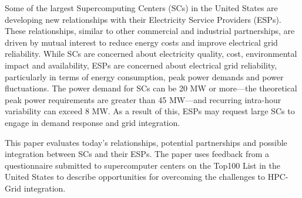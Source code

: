 Some of the largest Supercomputing Centers (SCs) in the United States are developing new relationships with their Electricity Service Providers (ESPs). These relationships, similar to other commercial and industrial partnerships, are driven by mutual interest to reduce energy costs and improve electrical grid reliability. While SCs are concerned about electricity quality, cost, environmental impact and availability, ESPs are concerned about electrical grid reliability, particularly in terms of energy consumption, peak power demands and power fluctuations. The power demand for SCs can be 20 MW or more---the theoretical peak power requirements are greater than 45 MW---and recurring intra-hour variability can exceed 8 MW. As a result of this, ESPs may request large SCs to engage in demand response and grid integration. 

This paper evaluates today's relationships, potential partnerships and possible integration between SCs and their ESPs. The paper uses feedback from a questionnaire submitted to supercomputer centers on the Top100 List in the United States to describe opportunities for overcoming the challenges to HPC-Grid integration. \\ 

%
%
%
%
%
%
